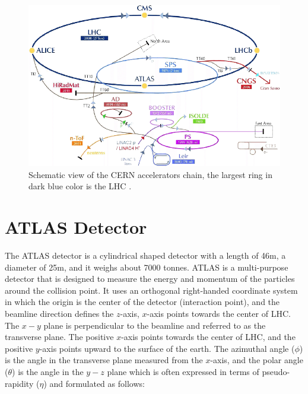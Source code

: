 \begin{figure}[H]
\centering
\includegraphics[scale=0.5]{Figures/Schematic-view-of-the-CERN-accelerator-complex.png}
\decoRule
\caption{Schematic view of the CERN accelerators chain, the largest ring in dark blue color is the LHC \cite{cernschematic}.}
\label{fig:cern}
\end{figure}


\section{ATLAS Detector}
\label{section:ATLAS}

The ATLAS detector is a cylindrical shaped detector with a length of 46m, a diameter of 25m, and it weighs about 7000 tonnes. ATLAS is a multi-purpose detector that is designed to measure the energy and momentum of the particles around the collision point. It uses an orthogonal right-handed coordinate system in which the origin is the center of the detector (interaction point), and the beamline direction defines the $z$-axis, $x$-axis points towards the center of LHC. The $x-y$ plane is perpendicular to the beamline and referred to as the transverse plane. The positive $x$-axis points towards the center of LHC, and the positive $y$-axis points upward to the surface of the earth. The azimuthal angle ($\phi$) is the angle in the transverse plane measured from the $x$-axis, and the polar angle ($\theta$) is the angle in the $y-z$ plane which is often expressed in terms of pseudo-rapidity ($\eta$) and formulated as follows:

